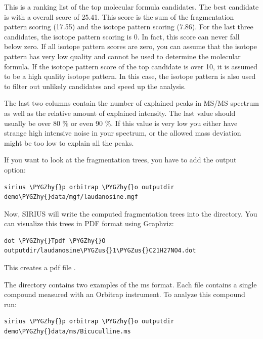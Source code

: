 \documentclass[letterpaper,10pt,openany,oneside]{sphinxmanual}
\def\PYGZus{\char`\_}
\def\PYGZhy{\char`\-}
\begin{document}
This is a ranking list of the top molecular formula candidates. The best
candidate is  with a overall score of 25.41. This score is the
sum of the fragmentation pattern scoring (17.55) and the isotope pattern
scoring (7.86). For the last three candidates, the isotope pattern scoring is
0. In fact, this score can never fall below zero. If all isotope pattern
scores are zero, you can assume that the isotope pattern has very low quality
and cannot be used to determine the molecular formula. If the isotope pattern
score of the top candidate is over 10, it is assumed to be a high quality
isotope pattern. In this case, the isotope pattern is also used to filter out
unlikely candidates and speed up the analysis.

The last two columns contain the number of explained peaks in MS/MS spectrum
as well as the relative amount of explained intensity. The last value should
usually be over 80 \% or even 90 \%. If this value is very low you either
have strange high intensive noise in your spectrum, or the allowed mass
deviation might be too low to explain all the peaks.

If you want to look at the fragmentation trees, you have to add the output
option:

\begin{Verbatim}[commandchars=\\\{\}]
sirius \PYGZhy{}p orbitrap \PYGZhy{}o outputdir demo\PYGZhy{}data/mgf/laudanosine.mgf
\end{Verbatim}

Now, SIRIUS will write the computed fragmentation trees into
the  directory. You can visualize this trees in PDF format
using Graphviz:

\begin{Verbatim}[commandchars=\\\{\}]
dot \PYGZhy{}Tpdf \PYGZhy{}O outputdir/laudanosine\PYGZus{}1\PYGZus{}C21H27NO4.dot
\end{Verbatim}

This creates a pdf file .

The directory  contains two examples of the ms format. Each file contains a single compound measured with an Orbitrap instrument. To analyze this compound run:

\begin{Verbatim}[commandchars=\\\{\}]
sirius \PYGZhy{}p orbitrap \PYGZhy{}o outputdir demo\PYGZhy{}data/ms/Bicuculline.ms
\end{Verbatim}
\end{document}

